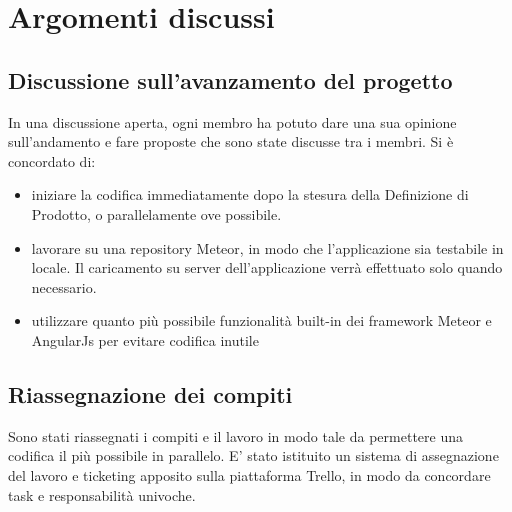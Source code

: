 \documentclass[a4paper,11pt]{article}
\begin{document}
	\newpage
	\section{Argomenti discussi}
		\subsection{Discussione sull'avanzamento del progetto}
		In una discussione aperta, ogni membro ha potuto dare una sua opinione sull'andamento e fare proposte che sono state discusse tra i membri.
		Si è concordato di:
		\begin{itemize}
			\item iniziare la codifica immediatamente dopo la stesura della Definizione di Prodotto, o parallelamente ove possibile.
			\item lavorare su una repository Meteor, in modo che l'applicazione sia testabile in locale. Il caricamento su server dell'applicazione verrà effettuato solo quando necessario.
			\item utilizzare quanto più possibile funzionalità built-in dei framework Meteor e AngularJs per evitare codifica inutile
		\end{itemize}
		\subsection{Riassegnazione dei compiti}
		Sono stati riassegnati i compiti e il lavoro in modo tale da permettere una codifica il più possibile in parallelo. E' stato istituito un sistema di assegnazione del lavoro e ticketing apposito sulla piattaforma Trello, in modo da concordare task e responsabilità univoche.
								
\end{document}
